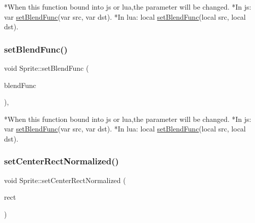 \begin{DoxyCode}
*When \textcolor{keyword}{this} \textcolor{keyword}{function} bound into js or lua,the parameter will be changed.
*In js: var \hyperlink{classSprite_af78e53072fccdf0491c02098c55b282f}{setBlendFunc}(var src, var dst).
*In lua: local \hyperlink{classSprite_af78e53072fccdf0491c02098c55b282f}{setBlendFunc}(local src, local dst).
\end{DoxyCode}
 \mbox{\label{classSprite_af78e53072fccdf0491c02098c55b282f}} 
\subsubsection{\texorpdfstring{set\+Blend\+Func()}{setBlendFunc()}\hspace{0.1cm}{\footnotesize\ttfamily [2/2]}}
{\footnotesize\ttfamily void Sprite\+::set\+Blend\+Func (\begin{DoxyParamCaption}\item[{const \hyperlink{structBlendFunc}{Blend\+Func} \&}]{blend\+Func }\end{DoxyParamCaption})\hspace{0.3cm}{\ttfamily [inline]}, {\ttfamily [override]}}


\begin{DoxyCode}
*When \textcolor{keyword}{this} \textcolor{keyword}{function} bound into js or lua,the parameter will be changed.
*In js: var \hyperlink{classSprite_af78e53072fccdf0491c02098c55b282f}{setBlendFunc}(var src, var dst).
*In lua: local \hyperlink{classSprite_af78e53072fccdf0491c02098c55b282f}{setBlendFunc}(local src, local dst).
\end{DoxyCode}
 \mbox{\label{classSprite_a63f00ef8a92e2aa52fec1dc288e233f2}} 
\subsubsection{\texorpdfstring{set\+Center\+Rect\+Normalized()}{setCenterRectNormalized()}}
{\footnotesize\ttfamily void Sprite\+::set\+Center\+Rect\+Normalized (\begin{DoxyParamCaption}\item[{const \hyperlink{classRect}{Rect} \&}]{rect }\end{DoxyParamCaption})\hspace{0.3cm}{\ttfamily [virtual]}}

